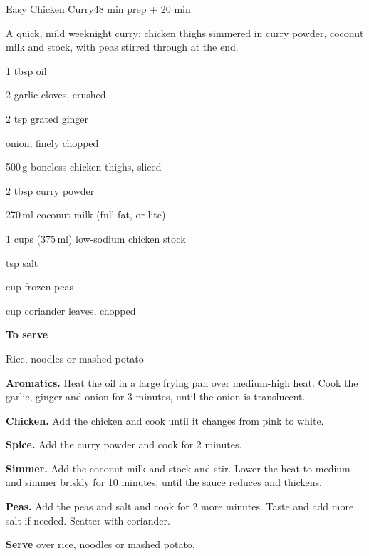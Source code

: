 \begin{recipebox}{Easy Chicken Curry}{4}{8 min prep + 20 min}

A quick, mild weeknight curry: chicken thighs simmered in curry powder, coconut
milk and stock, with peas stirred through at the end.

\begin{ingredients}
  \item 1 tbsp oil
  \item 2 garlic cloves, crushed
  \item 2 tsp grated ginger
  \item {} onion, finely chopped
  \item 500\,g boneless chicken thighs, sliced
  \item 2 tbsp curry powder
  \item 270\,ml coconut milk (full fat, or lite)
  \item 1 cups (375\,ml) low-sodium chicken stock
  \item {} tsp salt
  \item {} cup frozen peas
  \item {} cup coriander leaves, chopped
  \item[] \textbf{To serve}
  \item Rice, noodles or mashed potato
\end{ingredients}

\begin{method}
  \item \textbf{Aromatics.} Heat the oil in a large frying pan over medium-high
        heat. Cook the garlic, ginger and onion for 3 minutes, until the onion is
        translucent.
  \item \textbf{Chicken.} Add the chicken and cook until it changes from pink to
        white.
  \item \textbf{Spice.} Add the curry powder and cook for 2 minutes.
  \item \textbf{Simmer.} Add the coconut milk and stock and stir. Lower the heat to
        medium and simmer briskly for 10 minutes, until the sauce reduces and
        thickens.
  \item \textbf{Peas.} Add the peas and salt and cook for 2 more minutes. Taste and
        add more salt if needed. Scatter with coriander.
  \item \textbf{Serve} over rice, noodles or mashed potato.
\end{method}


\end{recipebox}
